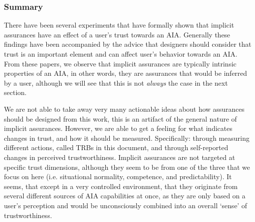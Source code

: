 \subsubsection{Summary}
There have been several experiments that have formally shown that implicit assurances have an effect of a user's trust towards an AIA. Generally these findings have been accompanied by the advice that designers should consider that trust is an important element and can affect user's behavior towards an AIA. From these papers, we observe that implicit assurances are typically intrinsic properties of an AIA, in other words, they are assurances that would be inferred by a user, although we will see that this is not \emph{always} the case in the next section. 

We are not able to take away very many actionable ideas about how assurances should be designed from this work, this is an artifact of the general nature of implicit assurances. However, we are able to get a feeling for what indicates changes in trust, and how it should be measured. Specifically: through measuring different actions, called TRBs in this document, and through self-reported changes in perceived trustworthiness. Implicit assurances are not targeted at specific trust dimensions, although they seem to be from one of the three that we focus on here (i.e. situational normality, competence, and predictability). It seems, that except in a very controlled environment, that they originate from several different sources of AIA capabilities at once, as they are only based on a user's perception and would be unconsciously combined into an overall `sense' of trustworthiness.
